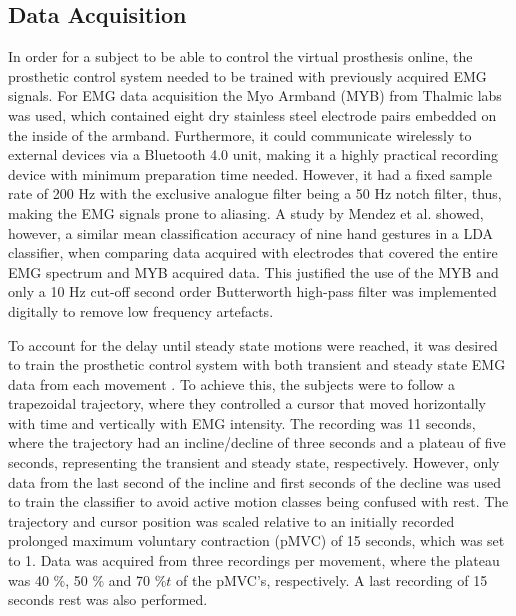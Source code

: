 \subsection{Data Acquisition}

In order for a subject to be able to control the virtual prosthesis online, the prosthetic control system needed to be trained with previously acquired EMG signals. For EMG data acquisition the Myo Armband (MYB) from Thalmic labs was used, which contained eight dry stainless steel electrode pairs embedded on the inside of the armband. Furthermore, it could communicate wirelessly to external devices via a Bluetooth 4.0 unit, making it a highly practical recording device with minimum preparation time needed. However, it had a fixed sample rate of 200 Hz with the exclusive analogue filter being a 50 Hz notch filter, thus, making the EMG signals prone to aliasing. A study by Mendez et al. \cite{Mendez2017} showed, however, a similar mean classification accuracy of nine hand gestures in a LDA classifier, when comparing data acquired with electrodes that covered the entire EMG spectrum and MYB acquired data. This justified the use of the MYB and only a 10 Hz cut-off second order Butterworth high-pass filter was implemented digitally to remove low frequency artefacts.

To account for the delay until steady state motions were reached, it was desired to train the prosthetic control system with both transient and steady state EMG data from each movement \cite{Boschmann2013}. To achieve this, the subjects were to follow a trapezoidal trajectory, where they controlled a cursor that moved horizontally with time and vertically with EMG intensity. The recording was 11 seconds, where the trajectory had an incline/decline of three seconds and a plateau of five seconds, representing the transient and steady state, respectively. However, only data from the last second of the incline and first seconds of the decline was used to train the classifier to avoid active motion classes being confused with rest. The trajectory and cursor position was scaled relative to an initially recorded prolonged maximum voluntary contraction (pMVC) of 15 seconds, which was set to 1. Data was acquired from three recordings per movement, where the plateau was 40 $\%$, 50 $\%$ and 70 $\%t$ of the pMVC's, respectively. A last recording of 15 seconds rest was also performed.

